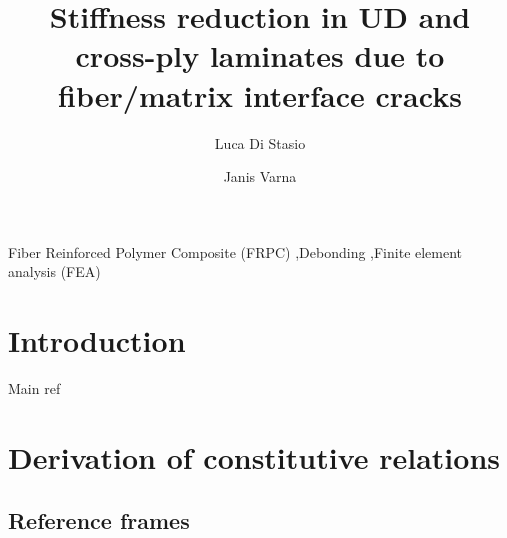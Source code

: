 \documentclass[review]{elsarticle}
\begin{document}
\begin{frontmatter}

\title{Stiffness reduction in UD and cross-ply laminates due to fiber/matrix interface cracks}


\author[lulea]{Luca Di Stasio}
\author[lulea]{Janis Varna}


\address[lulea]{Lule\aa\ University of Technology, University Campus, SE-97187 Lule\aa, Sweden}


\begin{abstract}

\end{abstract}

\begin{keyword}
Fiber Reinforced Polymer Composite (FRPC) \sep Debonding \sep Finite element analysis (FEA)
\end{keyword}

\end{frontmatter}

\linenumbers

\section{Introduction}

Main ref~\cite{Varna2018}

\section{Derivation of constitutive relations}

\subsection{Reference frames}
\end{document}
